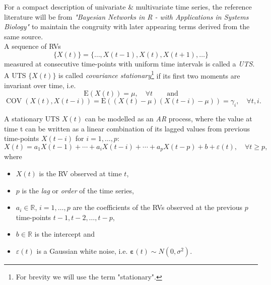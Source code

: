 
For a compact description of {univariate \& multivariate time series, the reference literature will be from \textit{"Bayesian Networks in R - with Applications in Systems Biology"} \citep{nagarajan2013bayesian} to maintain the congruity with later appearing terms derived from the same source.
\\

A sequence of \acp{RV} 
\begin{equation}
\{X(t)\}=\{\ldots, X(t-1), X(t), X(t+1), \ldots\}
\end{equation}
measured at consecutive time-points with uniform time intervals is called a \textit{\ac{UTS}}. A \ac{UTS} $\{X(t)\}$ is called \textit{covariance stationary}\footnote{For brevity we will use the term "stationary".}} if its first two moments are invariant over time, i.e.
\begin{equation}
\mathrm{E}(X(t))=\mu, \quad \forall t \qquad \text{and}
\end{equation}
\begin{equation} \operatorname{COV}(X(t), X(t-i))=\mathrm{E}((X(t)-\mu)(X(t-i)-\mu))=\gamma_{i}, \quad \forall t, i.
\end{equation}

A stationary \ac{UTS} $X(t)$ can be modelled as an \textit{\ac{AR}} process, where the value at time t can be written as a linear combination of its lagged values from previous time-points $X(t-i)$ for $i=1,\ldots,p$:
\begin{equation}
 X(t)=a_{1} X(t-1)+\cdots+a_{i} X(t-i)+\cdots+a_{p} X(t-p)+b+\varepsilon(t), \quad \forall t \geqslant p,
\end{equation}
where
\begin{itemize}
\item $X(t)$ is the \ac{RV} observed at time $t$,
\item $p$ is the \textit{lag} or \textit{order} of the time series,
\item $a_{i} \in \mathbb{R}$, $i=1, \ldots, p$ are the coefficients of the \acp{RV} observed at the previous $p$ time-points $t-1, t-2, \ldots, t-p$,
\item $b \in \mathbb{R}$ is the intercept and
\item $\varepsilon(t)$ is a Gaussian white noise, i.e. $\boldsymbol{\varepsilon}(t) \sim N\left(0, \sigma^{2}\right)$. 
\end{itemize}


